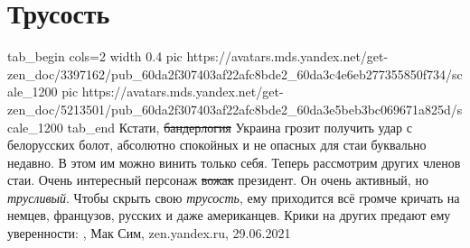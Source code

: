  
 
 
 
 
\chapter{Трусость}
\label{sec:slova.trusost}

\ifcmt
  tab_begin cols=2
		width 0.4
	  pic https://avatars.mds.yandex.net/get-zen_doc/3397162/pub_60da2f307403af22afc8bde2_60da3c4e6eb277355850f734/scale_1200
    pic https://avatars.mds.yandex.net/get-zen_doc/5213501/pub_60da2f307403af22afc8bde2_60da3e5beb3bc069671a825d/scale_1200
  tab_end
\fi
Кстати, \sout{бандерлогия} Украина грозит получить удар с белорусских болот, абсолютно
спокойных и не опасных для стаи буквально недавно. В этом им можно винить
только себя.  Теперь рассмотрим других членов стаи. Очень интересный персонаж
\sout{вожак} президент. Он очень активный, но \emph{трусливый}. Чтобы скрыть свою \emph{трусость},
ему приходится всё громче кричать на немцев, французов, русских и даже
американцев. Крики на других предают ему уверенности:
, 
Мак Сим, zen.yandex.ru, 29.06.2021
